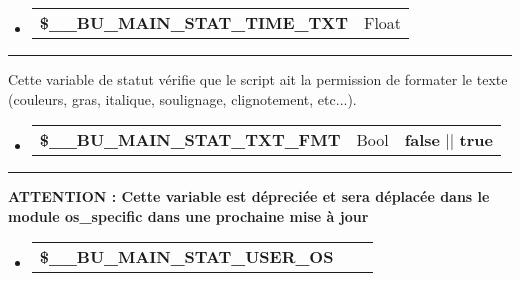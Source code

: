 \documentclass[a4paper,10pt]{article}
\begin{document}
\begin{justify}
     \begin{itemize}
        \item
        {
            \begin{tabular}{l|l}
                \textbf{\color{vars}\$\_\_BU\_MAIN\_STAT\_TIME\_TXT}  & Float\\[1\baselineskip]
            \end{tabular}
        }
    \end{itemize}
\end{justify}


\par\noindent\rule{\textwidth}{0.4pt}

\begin{justify}
    Cette variable de statut vérifie que le script ait la permission de formater le texte (couleurs, gras, italique, soulignage, clignotement, etc...).
\end{justify}

\begin{justify}
     \begin{itemize}
        \item
        {
            \begin{tabular}{l|l|l}
                \textbf{\color{vars}\$\_\_BU\_MAIN\_STAT\_TXT\_FMT}   & Bool & \textbf{false} || \textbf{true}\\[1\baselineskip]
            \end{tabular}
        }
    \end{itemize}
\end{justify}


\par\noindent\rule{\textwidth}{0.4pt}

\begin{justify}
\textbf{ATTENTION : Cette variable est dépreciée et sera déplacée dans le module \textbf{\color{lime}os\_specific} dans une prochaine mise à jour}
\end{justify}

\begin{justify}
     \begin{itemize}
        \item
        {
            \begin{tabular}{l|l|l}
                \textbf{\color{vars}\$\_\_BU\_MAIN\_STAT\_USER\_OS}   & &\\[1\baselineskip]
            \end{tabular}
        }
    \end{itemize}
\end{justify}
\end{document}
